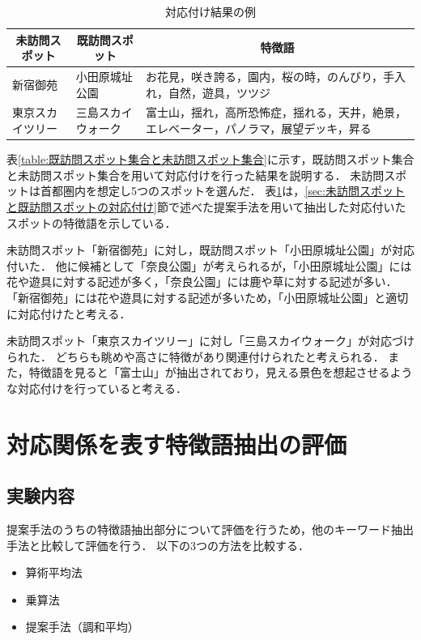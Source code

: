 \documentclass[submit]{ipsj}
\begin{document}
\begin{table}[t]
  \caption{対応付け結果の例}
  \label{table:対応付け結果の例}
  \centering
  \begin{tabular}{l|l|l}
  \hline  \hline
  \multicolumn{1}{c|}{未訪問スポット} & \multicolumn{1}{c|}{既訪問スポット} & \multicolumn{1}{c}{特徴語}                     \\ \hline
  新宿御苑                      & 小田原城址公園                         & お花見，咲き誇る，園内，桜の時，のんびり，手入れ，自然，遊具，ツツジ          \\
  東京スカイツリー                     & 三島スカイウォーク                    & 富士山，揺れ，高所恐怖症，揺れる，天井，絶景，エレベーター，パノラマ，展望デッキ，昇る \\ \hline
  \end{tabular}
\end{table}

表\ref{table:既訪問スポット集合と未訪問スポット集合}に示す，既訪問スポット集合と未訪問スポット集合を用いて対応付けを行った結果を説明する．
未訪問スポットは首都圏内を想定し5つのスポットを選んだ．
表\ref{table:対応付け結果の例}は，\ref{sec:未訪問スポットと既訪問スポットの対応付け}節で述べた提案手法を用いて抽出した対応付いたスポットの特徴語を示している．

未訪問スポット「新宿御苑」に対し，既訪問スポット「小田原城址公園」が対応付いた．
他に候補として「奈良公園」が考えられるが，「小田原城址公園」には花や遊具に対する記述が多く，「奈良公園」には鹿や草に対する記述が多い．
「新宿御苑」には花や遊具に対する記述が多いため，「小田原城址公園」と適切に対応付けたと考える．

未訪問スポット「東京スカイツリー」に対し「三島スカイウォーク」が対応づけられた．
どちらも眺めや高さに特徴があり関連付けられたと考えられる．
また，特徴語を見ると「富士山」が抽出されており，見える景色を想起させるような対応付けを行っていると考える．

\section{対応関係を表す特徴語抽出の評価}
\label{sec:対応関係を表す特徴語抽出の評価}
\subsection{実験内容}
提案手法のうちの特徴語抽出部分について評価を行うため，他のキーワード抽出手法と比較して評価を行う．
以下の3つの方法を比較する．
\begin{itemize}
  \item 算術平均法
  \item 乗算法
  \item 提案手法（調和平均）
\end{itemize}
\end{document}
